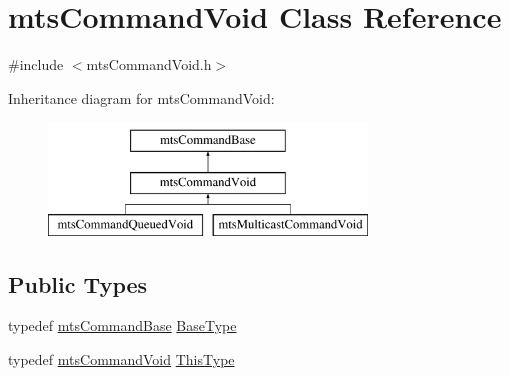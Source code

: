 \hypertarget{classmts_command_void}{}\section{mts\+Command\+Void Class Reference}
\label{classmts_command_void}


{\ttfamily \#include $<$mts\+Command\+Void.\+h$>$}

Inheritance diagram for mts\+Command\+Void\+:\begin{figure}[H]
\begin{center}
\leavevmode
\includegraphics[height=3.000000cm]{db/d74/classmts_command_void}
\end{center}
\end{figure}
\subsection*{Public Types}
\begin{DoxyCompactItemize}
\item 
typedef \hyperlink{classmts_command_base}{mts\+Command\+Base} \hyperlink{classmts_command_void_aa0e2be86c520aef7b9c3a59e3cfbbce3}{Base\+Type}
\item 
typedef \hyperlink{classmts_command_void}{mts\+Command\+Void} \hyperlink{classmts_command_void_ae909e0b365485d0923193cec9331f8ce}{This\+Type}
\end{DoxyCompactItemize}
